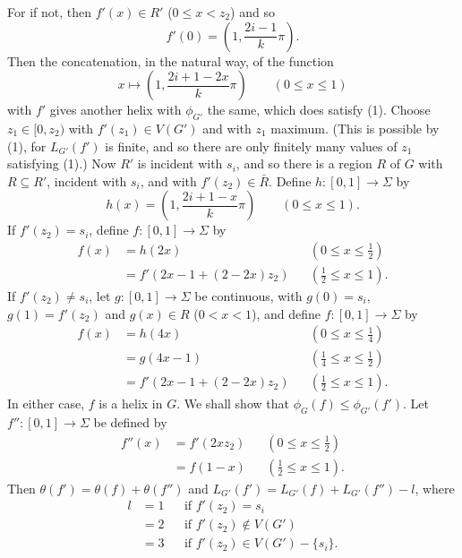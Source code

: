 For if not, then $f'(x) \in R'$ ($0 \le x < z_2$) and so
\begin{equation*}
f'(0) = \left( 1, \frac{2i-1}{k} \pi \right).
\end{equation*}
Then the concatenation, in the natural way, of the function
\begin{equation*}
x \mapsto \left( 1, \frac{2i+1-2x}{k} \pi \right) \qquad (0 \le x \le 1)
\end{equation*}
with $f'$ gives another helix with $\phi_{G'}$ the same, which does satisfy (1). Choose $z_1 \in [0, z_2)$ with $f'(z_1) \in V(G')$ and with $z_1$ maximum. (This is possible by (1), for $L_{G'}(f')$ is finite, and so there are only finitely many values of $z_1$ satisfying (1).) Now $R'$ is incident with $s_i$, and so there is a region $R$ of $G$ with $R \subseteq R'$, incident with $s_i$, and with $f'(z_2) \in \bar{R}$. Define $h \colon [0, 1] \to \Sigma$ by
\begin{equation*}
h(x) = \left( 1, \frac{2i+1-x}{k} \pi \right) \qquad (0 \le x \le 1).
\end{equation*}
If $f'(z_2) = s_i$, define $f \colon [0, 1] \to \Sigma$ by
\begin{align*}
f(x) &= h(2x) && (0 \le x \le \frac{1}{2}) \\
&= f'(2x - 1 + (2 - 2x)z_2) && (\frac{1}{2} \le x \le 1).
\end{align*}
If $f'(z_2) \ne s_i$, let $g \colon [0, 1] \to \Sigma$ be continuous, with $g(0) = s_i$, $g(1) = f'(z_2)$ and $g(x) \in R$ ($0 < x < 1$), and define $f \colon [0, 1] \to \Sigma$ by
\begin{align*}
f(x) &= h(4x) && (0 \le x \le \frac{1}{4}) \\
&= g(4x - 1) && (\frac{1}{4} \le x \le \frac{1}{2}) \\
&= f'(2x - 1 + (2 - 2x)z_2) && (\frac{1}{2} \le x \le 1).
\end{align*}
In either case, $f$ is a helix in $G$. We shall show that $\phi_G(f) \le \phi_{G'}(f')$. Let $f'' \colon [0, 1] \to \Sigma$ be defined by
\begin{align*}
f''(x) &= f'(2xz_2) && (0 \le x \le \frac{1}{2}) \\
&= f(1 - x) && (\frac{1}{2} \le x \le 1).
\end{align*}
Then $\theta(f') = \theta(f) + \theta(f'')$ and $L_{G'}(f') = L_{G'}(f) + L_{G'}(f'') - l$, where
\begin{align*}
l &= 1 && \text{if } f'(z_2) = s_i \\
&= 2 && \text{if } f'(z_2) \notin V(G') \\
&= 3 && \text{if } f'(z_2) \in V(G') - \{s_i\}.
\end{align*}
